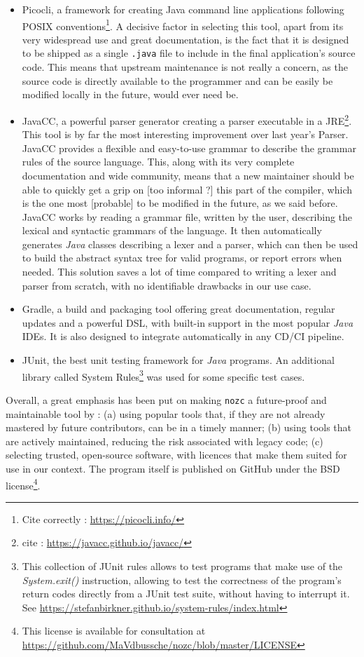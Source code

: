 \begin{itemize}
    \item Picocli, a framework for creating Java command line applications following POSIX conventions\footnote{Cite correctly : \url{https://picocli.info/}}.
    A decisive factor in selecting this tool, apart from its very widespread use and great documentation, is the fact that it is designed to be shipped as a single \texttt{.java} file to include in the final application's source code.
    This means that upstream maintenance is not really a concern, as the source code is directly available to the programmer and can be easily be modified locally in the future, would ever need be.
    \item JavaCC, a powerful parser generator creating a parser executable in a JRE\footnote{cite : \url{https://javacc.github.io/javacc/}}.
    This tool is by far the most interesting improvement over last year's Parser.
    JavaCC provides a flexible and easy-to-use grammar to describe the grammar rules of the source language.
    This, along with its very complete documentation and wide community, means that a new maintainer should be able to quickly get a grip on [too informal ?] this part of the compiler, which is the one most [probable] to be modified in the future, as we said before.
    JavaCC works by reading a grammar file, written by the user, describing the lexical and syntactic grammars of the language.
    It then automatically generates \textit{Java} classes describing a lexer and a parser, which can then be used to build the abstract syntax tree for valid programs, or report errors when needed.
    This solution saves a lot of time compared to writing a lexer and parser from scratch, with no identifiable drawbacks in our use case.
    \item Gradle, a build and packaging tool offering great documentation, regular updates and a powerful DSL, with built-in support in the most popular \textit{Java} IDEs.
    It is also designed to integrate automatically in any CD/CI pipeline.
    \item JUnit, the best unit testing framework for \textit{Java} programs.
    An additional library called System Rules\footnote{This collection of JUnit rules allows to test programs that make use of the \textit{System.exit()} instruction, allowing to test the correctness of the program's return codes directly from a JUnit test suite, without having to interrupt it. See \url{https://stefanbirkner.github.io/system-rules/index.html}} was used for some specific test cases.
\end{itemize}
Overall, a great emphasis has been put on making \texttt{nozc} a future-proof and maintainable tool by : (a) using popular tools that, if they are not already mastered by future contributors, can be in a timely manner; (b) using tools that are actively maintained, reducing the risk associated with legacy code; (c) selecting trusted, open-source software, with licences that make them suited for use in our context.\newline
The program itself is published on GitHub under the BSD license\footnote{This license is available for consultation at \url{https://github.com/MaVdbussche/nozc/blob/master/LICENSE}}.

